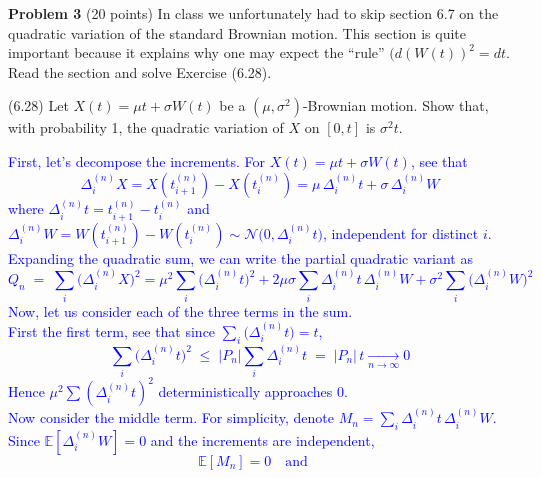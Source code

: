 \documentclass{article}
\begin{document}
\textbf{Problem 3}   (20 points) In class we unfortunately had to skip section 6.7 on the quadratic variation of the standard Brownian motion. This section is quite important because it explains why one may expect the “rule” 
$(d(W(t))^2 = dt.$
Read the section and solve Exercise (6.28).

(6.28) Let $X(t) = \mu t + \sigma W(t)$ be a $(\mu, \sigma^2)$-Brownian motion. Show that, with probability 1, the quadratic variation of $X$ on $[0, t]$ is $\sigma^2 t$.

\textcolor{blue}{
First, let's decompose the increments.
For $X(t)=\mu t+\sigma W(t)$, see that
$$
\Delta_i^{(n)}X=X(t_{i+1}^{(n)})-X(t_i^{(n)})=\mu\,\Delta_i^{(n)}t+\sigma\,\Delta_i^{(n)}W
$$
where $\Delta_i^{(n)}t=t_{i+1}^{(n)}-t_i^{(n)}$ and $\Delta_i^{(n)}W=W(t_{i+1}^{(n)})-W(t_i^{(n)})\sim\mathcal N\bigl(0,\Delta_i^{(n)}t\bigr)$, independent for distinct $i$. \\
Expanding the quadratic sum, we can write the partial quadratic variant as
$$
Q_n\;=\;\sum_{i}\bigl(\Delta_i^{(n)}X\bigr)^2
       =\mu^{2}\sum_{i}\bigl(\Delta_i^{(n)}t\bigr)^2
        +2\mu\sigma\sum_{i}\Delta_i^{(n)}t\,\Delta_i^{(n)}W
        +\sigma^{2}\sum_{i}\bigl(\Delta_i^{(n)}W\bigr)^2
$$
Now, let us consider each of the three terms in the sum. \\
First the first term, see that since $\sum_{i}\bigl(\Delta_i^{(n)}t\bigr)=t$,
$$
\sum_{i}\bigl(\Delta_i^{(n)}t\bigr)^2\;\le\;|P_n|\sum_{i}\Delta_i^{(n)}t
           \;=\;|P_n|\,t\xrightarrow[n\to\infty]{}0
$$
Hence $\mu^{2}\sum(\Delta_i^{(n)}t)^2$ deterministically approaches 0. \\
Now consider the middle term. For simplicity, denote 
$M_n=\sum_{i}\Delta_i^{(n)}t\,\Delta_i^{(n)}W$. 
Since $\mathbb E[\Delta_i^{(n)}W]=0$ and the increments are independent,
$$
\mathbb E[M_n]=0\quad \text{and} \quad
$$}
\end{document}
